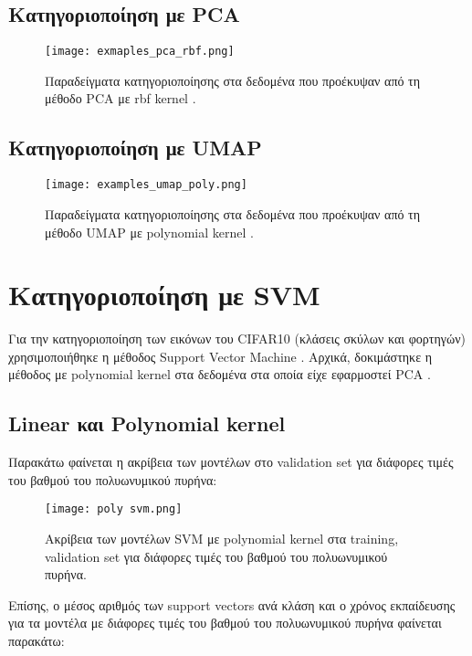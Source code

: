 \documentclass[a4paper,12pt]{article}
\newcommand{\lt}{\latintext}
\newcommand{\gt}{\greektext}
\begin{document}
\subsection{Κατηγοριοποίηση με \lt PCA \gt}
\begin{center}
\begin{figure}[H]
    \texttt{[image: exmaples\_pca\_rbf.png]}
    \caption{Παραδείγματα κατηγοριοποίησης στα δεδομένα που προέκυψαν από τη μέθοδο \lt PCA \gt με \lt rbf kernel \gt.}
    \label{fig:pca_examples}
\end{figure}
\end{center}

\subsection{Κατηγοριοποίηση με \lt UMAP \gt}

\begin{figure}[H]
    \centering
   \texttt{[image: examples\_umap\_poly.png]}
    \caption{Παραδείγματα κατηγοριοποίησης στα δεδομένα που προέκυψαν από τη μέθοδο \lt UMAP \gt με \lt polynomial kernel \gt.}
    \label{fig:umap_examples}
\end{figure}


\section{Κατηγοριοποίηση με \lt SVM \gt}

Για την κατηγοριοποίηση των εικόνων του \lt CIFAR10 \gt (κλάσεις σκύλων και φορτηγών) χρησιμοποιήθηκε η μέθοδος \lt Support Vector Machine \gt.
Αρχικά, δοκιμάστηκε η μέθοδος με \lt polynomial kernel \gt στα δεδομένα στα οποία είχε εφαρμοστεί \lt PCA \gt. 

 
\subsection{\lt Linear \gt και \lt Polynomial kernel \gt}
Παρακάτω φαίνεται η ακρίβεια των μοντέλων στο \lt validation set \gt για διάφορες τιμές 
του βαθμού του πολυωνυμικού πυρήνα:

\begin{figure}[H]
    \centering
    \texttt{[image: poly svm.png]}
    \caption{Ακρίβεια των μοντέλων \lt SVM \gt με \lt polynomial kernel \gt στα \lt training, validation set \gt για διάφορες τιμές του βαθμού του πολυωνυμικού πυρήνα.}
    \label{fig:poly_svm}
\end{figure}
Επίσης, ο μέσος αριθμός των \lt support vectors \gt ανά κλάση και ο χρόνος εκπαίδευσης για τα μοντέλα με διάφορες τιμές του βαθμού του πολυωνυμικού πυρήνα φαίνεται παρακάτω:
\end{document}
